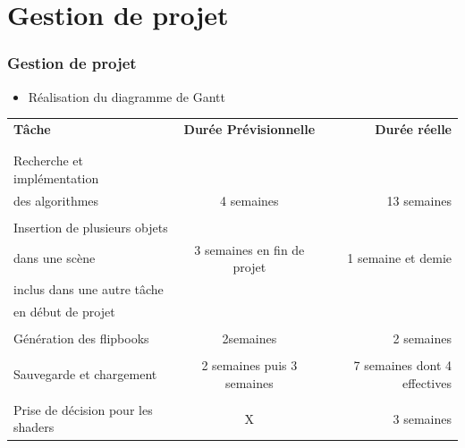 \documentclass{beamer}
\begin{document}

\section{Gestion de projet}


\begin{frame}
\frametitle{Gestion de projet}
\begin{itemize}[label=$\bullet$]
\item Réalisation du diagramme de Gantt
\end{itemize}
{\fontsize{7}{8}\selectfont
{}
\begin{tabular}{lcr}

\textbf{Tâche} & \textbf{Durée Prévisionnelle} & \textbf{Durée réelle} \\
\\
\hline
\\
Recherche et implémentation \\des algorithmes &
4 semaines & 13 semaines \\
\hline
\\
Insertion de plusieurs objets \\ dans une scène &
3 semaines en fin de projet & 
1 semaine et demie \\ inclus dans 
une autre tâche \\ en début de projet \\
\hline
\\
Génération des flipbooks & 2semaines & 2 semaines \\
\hline
\\
Sauvegarde et chargement & 2 semaines puis 3 semaines &
7 semaines dont 4 effectives \\
\hline
\\
Prise de décision pour les shaders & X & 3 semaines\\

\end{tabular}
}

\end{frame}
\end{document}
